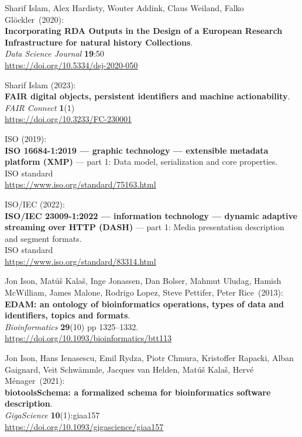 \begin{thebibliography}{9}
Sharif Islam, Alex Hardisty, Wouter Addink, Claus Weiland, Falko Glöckler~(2020):\\
\textbf{Incorporating RDA Outputs in the Design of a European Research Infrastructure for natural history Collections}.\\
\emph{Data Science Journal} \textbf{19}:50\\
\url{https://doi.org/10.5334/dsj-2020-050}

Sharif Islam (2023): \\
\textbf{FAIR digital objects, persistent identifiers and machine actionability}. \\
\emph{FAIR Connect} \textbf{1}(1) \\
\url{https://doi.org/10.3233/FC-230001}

ISO (2019): \\
\textbf{{ISO} 16684-1:2019 --- graphic technology --- extensible metadata platform (XMP)} --- part 1: Data model, serialization and core properties.\\
ISO standard\\
\url{https://www.iso.org/standard/75163.html}

ISO/IEC (2022): \\
\textbf{{ISO}/{IEC} 23009-1:2022 --- information technology ---
dynamic adaptive streaming over HTTP (DASH)} --- part 1: Media
presentation description and segment formats.\\
ISO standard\\
\url{https://www.iso.org/standard/83314.html}


Jon Ison, Matúš Kalaš, Inge Jonassen, Dan Bolser, Mahmut
Uludag, Hamish McWilliam, James Malone, Rodrigo Lopez, Steve Pettifer,
Peter Rice~(2013):\\
\textbf{EDAM: an ontology of bioinformatics operations, types of data
and identifiers, topics and formats}.\\
\emph{Bioinformatics} \textbf{29}(10) pp 1325--1332.\\
\url{https://doi.org/10.1093/bioinformatics/btt113}

Jon Ison, Hans Ienasescu, Emil Rydza, Piotr Chmura, Kristoffer
Rapacki, Alban Gaignard, Veit Schwämmle, Jacques van Helden, Matúš
Kalaš, Hervé Ménager~(2021):\\
\textbf{biotoolsSchema: a formalized schema for bioinformatics software description}.\\
\emph{GigaScience} \textbf{10}(1):giaa157\\
\url{https://doi.org/10.1093/gigascience/giaa157}


\end{thebibliography}

